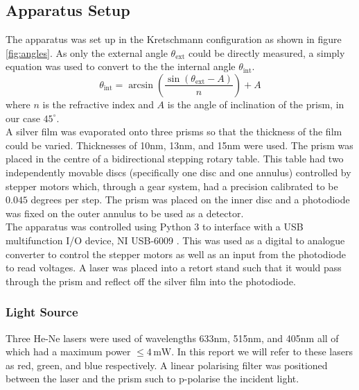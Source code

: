 \documentclass[%
reprint,
amsmath,amssymb,
aps,
]{revtex4-2}
\begin{document}
		\subsection{Apparatus Setup}
			The apparatus was set up in the Kretschmann configuration as shown in figure \ref{fig:angles}. As only the external angle $\theta_\text{ext}$ could be directly measured, a simply equation was used to convert to the the internal angle $\theta_\text{int}$.
			\begin{equation}
				\theta_\text{int} = \arcsin{\left( \frac{\sin{\left(\theta_\text{ext}-A\right)}}{n} \right)} + A
			\end{equation}where $n$ is the refractive index and $A$ is the angle of inclination of the prism, in our case $45^\circ$. \\
		
			A silver film was evaporated onto three prisms so that the thickness of the film could be varied. Thicknesses of 10nm, 13nm, and 15nm were used. The prism was placed in the centre of a bidirectional stepping rotary table. This table had two independently movable discs (specifically one disc and one annulus) controlled by stepper motors which, through a gear system, had a precision calibrated to be $0.045$ degrees per step. The prism was placed on the inner disc and a photodiode was fixed on the outer annulus to be used as a detector.\\
			
			The apparatus was controlled using Python 3 to interface with a USB multifunction I/O device, NI USB-6009 \cite{nationalInstruments}. This was used as a digital to analogue converter to control the stepper motors as well as an input from the photodiode to read voltages. A laser was placed into a retort stand such that it would pass through the prism and reflect off the silver film into the photodiode.

			\subsubsection{Light Source}
				Three He-Ne lasers were used of wavelengths 633nm, 515nm, and 405nm all of which had a maximum power $\le 4 \,\text{mW}$. In this report we will refer to these lasers as red, green, and blue respectively. A linear polarising filter was positioned between the laser and the prism such to p-polarise the incident light.
			
\end{document}
